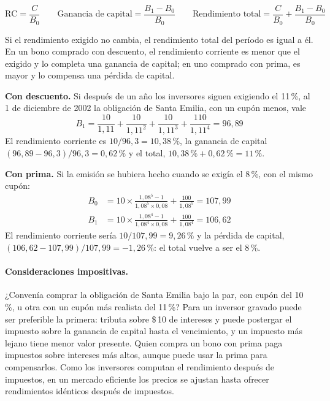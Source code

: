 \begin{formulaBox}
\[
\text{RC} = \frac{C}{B_0}
\qquad
\text{Ganancia de capital} = \frac{B_1 - B_0}{B_0}
\qquad
\text{Rendimiento total} = \frac{C}{B_0} + \frac{B_1 - B_0}{B_0}
\]
\end{formulaBox}

Si el rendimiento exigido no cambia, el rendimiento total del período es igual a él. En un bono comprado con descuento, el rendimiento corriente es menor que el exigido y lo completa una ganancia de capital; en uno comprado con prima, es mayor y lo compensa una pérdida de capital.

\begin{ejemplo}
\textbf{Con descuento.} Si después de un año los inversores siguen exigiendo el 11\,\%, al 1 de diciembre de 2002 la obligación de Santa Emilia, con un cupón menos, vale
\[
B_1 = \frac{10}{1{,}11} + \frac{10}{1{,}11^{2}} + \frac{10}{1{,}11^{3}} + \frac{110}{1{,}11^{4}} = 96{,}89
\]
El rendimiento corriente es $10/96{,}3 = 10{,}38\,\%$, la ganancia de capital $(96{,}89 - 96{,}3)/96{,}3 = 0{,}62\,\%$ y el total, $10{,}38\,\% + 0{,}62\,\% = 11\,\%$.

\textbf{Con prima.} Si la emisión se hubiera hecho cuando se exigía el 8\,\%, con el mismo cupón:
\[
\begin{aligned}
B_0 &= 10\times\frac{1{,}08^{5}-1}{1{,}08^{5}\times 0{,}08} + \frac{100}{1{,}08^{5}} = 107{,}99\\
B_1 &= 10\times\frac{1{,}08^{4}-1}{1{,}08^{4}\times 0{,}08} + \frac{100}{1{,}08^{4}} = 106{,}62
\end{aligned}
\]
El rendimiento corriente sería $10/107{,}99 = 9{,}26\,\%$ y la pérdida de capital, $(106{,}62 - 107{,}99)/107{,}99 = -1{,}26\,\%$: el total vuelve a ser el 8\,\%.
\end{ejemplo}

\paragraph{Consideraciones impositivas.} ¿Convenía comprar la obligación de Santa Emilia bajo la par, con cupón del 10\,\%, u otra con un cupón más realista del 11\,\%? Para un inversor gravado puede ser preferible la primera: tributa sobre \$\,10 de intereses y puede postergar el impuesto sobre la ganancia de capital hasta el vencimiento, y un impuesto más lejano tiene menor valor presente. Quien compra un bono con prima paga impuestos sobre intereses más altos, aunque puede usar la prima para compensarlos. Como los inversores computan el rendimiento después de impuestos, en un mercado eficiente los precios se ajustan hasta ofrecer rendimientos idénticos después de impuestos.

